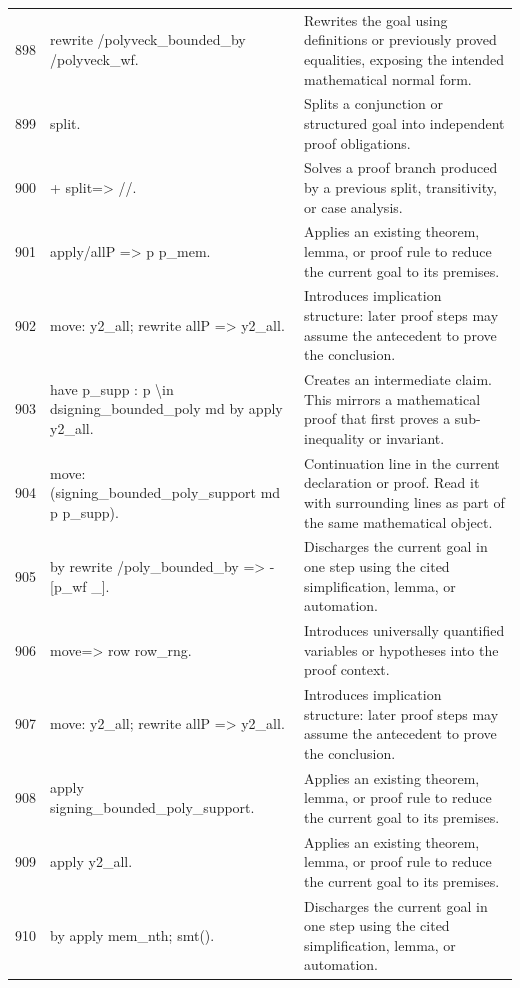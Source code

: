 \documentclass[10pt]{article}
\begin{document}
\begin{longtable}{r L{0.53\textwidth} L{0.37\textwidth}}
898 & {\ttfamily\scriptsize rewrite /polyveck\_bounded\_by /polyveck\_wf.} & Rewrites the goal using definitions or previously proved equalities, exposing the intended mathematical normal form. \\
899 & {\ttfamily\scriptsize split.} & Splits a conjunction or structured goal into independent proof obligations. \\
900 & {\ttfamily\scriptsize + split=> //.} & Solves a proof branch produced by a previous split, transitivity, or case analysis. \\
901 & {\ttfamily\scriptsize   apply/allP => p p\_mem.} & Applies an existing theorem, lemma, or proof rule to reduce the current goal to its premises. \\
902 & {\ttfamily\scriptsize   move: y2\_all; rewrite allP => y2\_all.} & Introduces implication structure: later proof steps may assume the antecedent to prove the conclusion. \\
903 & {\ttfamily\scriptsize   have p\_supp : p \textbackslash{}in dsigning\_bounded\_poly md by apply y2\_all.} & Creates an intermediate claim.  This mirrors a mathematical proof that first proves a sub-inequality or invariant. \\
904 & {\ttfamily\scriptsize   move: (signing\_bounded\_poly\_support md p p\_supp).} & Continuation line in the current declaration or proof.  Read it with surrounding lines as part of the same mathematical object. \\
905 & {\ttfamily\scriptsize   by rewrite /poly\_bounded\_by => -[p\_wf \_].} & Discharges the current goal in one step using the cited simplification, lemma, or automation. \\
906 & {\ttfamily\scriptsize move=> row row\_rng.} & Introduces universally quantified variables or hypotheses into the proof context. \\
907 & {\ttfamily\scriptsize move: y2\_all; rewrite allP => y2\_all.} & Introduces implication structure: later proof steps may assume the antecedent to prove the conclusion. \\
908 & {\ttfamily\scriptsize apply signing\_bounded\_poly\_support.} & Applies an existing theorem, lemma, or proof rule to reduce the current goal to its premises. \\
909 & {\ttfamily\scriptsize apply y2\_all.} & Applies an existing theorem, lemma, or proof rule to reduce the current goal to its premises. \\
910 & {\ttfamily\scriptsize by apply mem\_nth; smt().} & Discharges the current goal in one step using the cited simplification, lemma, or automation. \\

\end{longtable}
\end{document}
